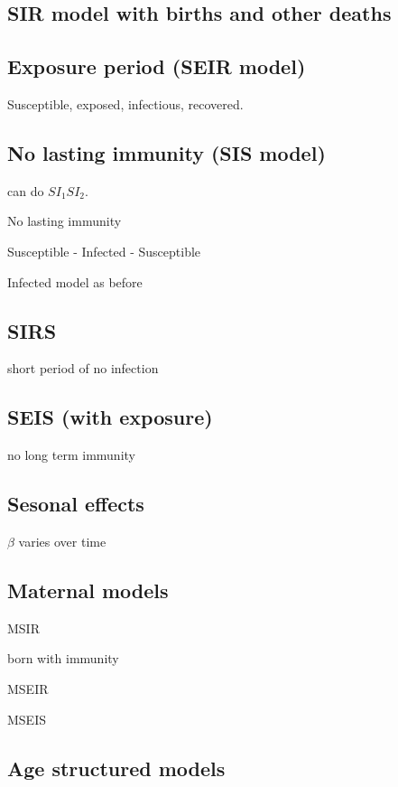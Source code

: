 
\subsection{SIR model with births and other deaths}

\subsection{Exposure period (SEIR model)}

Susceptible, exposed, infectious, recovered.

\subsection{No lasting immunity (SIS model)}

can do \(SI_1SI_2\).

No lasting immunity

Susceptible - Infected - Susceptible

Infected model as before

\subsection{SIRS}

short period of no infection

\subsection{SEIS (with exposure)}

no long term immunity

\subsection{Sesonal effects}

\(\beta \) varies over time

\subsection{Maternal models}

MSIR

born with immunity

MSEIR

MSEIS

\subsection{Age structured models}


